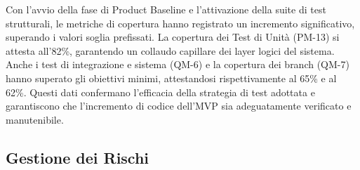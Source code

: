 \documentclass[a4paper,11pt,oneside]{scrartcl}
\begin{document}
Con l'avvio della fase di Product Baseline e l'attivazione della suite di test strutturali, le metriche di copertura hanno registrato un incremento significativo, superando i valori soglia prefissati. La copertura dei Test di Unità (PM-13) si attesta all'82\%, garantendo un collaudo capillare dei layer logici del sistema. Anche i test di integrazione e sistema (QM-6) e la copertura dei branch (QM-7) hanno superato gli obiettivi minimi, attestandosi rispettivamente al 65\% e al 62\%. Questi dati confermano l'efficacia della strategia di test adottata e garantiscono che l'incremento di codice dell'MVP sia adeguatamente verificato e manutenibile.

\subsection{Gestione dei Rischi}
\end{document}
